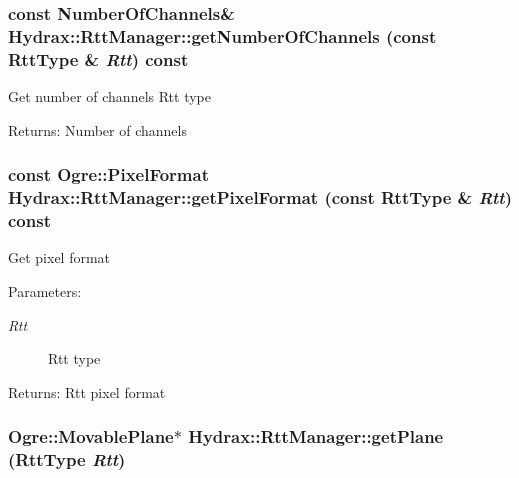 \begin{CompactItemize}
{\subsubsection[{getNumberOfChannels}]{\setlength{\rightskip}{0pt plus 5cm}const {\bf NumberOfChannels}\& Hydrax::RttManager::getNumberOfChannels (const {\bf RttType} \& {\em Rtt}) const}}
\label{class_hydrax_1_1_rtt_manager_88b7c387e413cf219f399926c2dbea7e}


Get number of channels  Rtt type \begin{Desc}
\item[Returns:]Number of channels \end{Desc}
\hypertarget{class_hydrax_1_1_rtt_manager_e94c4a88b240d9b7be93aa6c1430d2b6}{
\subsubsection[{getPixelFormat}]{\setlength{\rightskip}{0pt plus 5cm}const Ogre::PixelFormat Hydrax::RttManager::getPixelFormat (const {\bf RttType} \& {\em Rtt}) const}}
\label{class_hydrax_1_1_rtt_manager_e94c4a88b240d9b7be93aa6c1430d2b6}


Get pixel format \begin{Desc}
\item[Parameters:]
\begin{description}
\item[{\em Rtt}]Rtt type \end{description}
\end{Desc}
\begin{Desc}
\item[Returns:]Rtt pixel format \end{Desc}
\hypertarget{class_hydrax_1_1_rtt_manager_884250dca579c9cdff85bdec278715fe}{
\subsubsection[{getPlane}]{\setlength{\rightskip}{0pt plus 5cm}Ogre::MovablePlane$\ast$ Hydrax::RttManager::getPlane ({\bf RttType} {\em Rtt})}}
\label{class_hydrax_1_1_rtt_manager_884250dca579c9cdff85bdec278715fe}



\end{CompactItemize}

